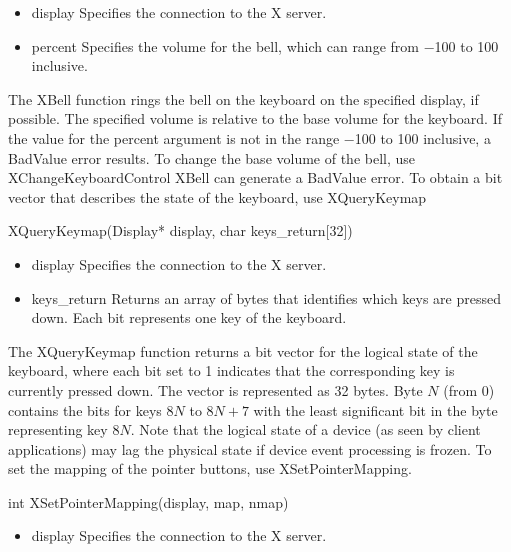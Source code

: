 \documentclass{report}
\begin{document}
\begin{itemize}
\begin{itemize}
\begin{itemize}
                \item display Speciﬁes the connection to the X server.
                \item percent Speciﬁes the volume for the bell, which can range from −100 to 100 inclusive.
            \end{itemize}
            The XBell function rings the bell on the keyboard on the specified display, if possible. The specified volume is relative to the base volume for the keyboard. If the value for the percent argument is not in the range −100 to 100 inclusive, a BadValue error results.
            \bigbreak \noindent 
            To change the base volume of the bell, use XChangeKeyboardControl
            \bigbreak \noindent 
            XBell can generate a BadValue error.
            \bigbreak \noindent 
            To obtain a bit vector that describes the state of the keyboard, use XQueryKeymap
            \bigbreak \noindent 
            \begin{cppcode}
                XQueryKeymap(Display* display, char keys_return[32])
            \end{cppcode}
            \bigbreak \noindent
            \begin{itemize}
                \item display Specifies the connection to the X server.
                \item keys\_return Returns an array of bytes that identifies which keys are pressed down. Each bit represents one key of the keyboard.
            \end{itemize}
            The XQueryKeymap function returns a bit vector for the logical state of the keyboard, where each bit set to 1 indicates that the corresponding key is currently pressed down. The vector is represented as 32 bytes. Byte $N$ (from 0) contains the bits for keys $8N$ to $8N + 7$ with the least significant bit in the byte representing key $8N$.
            \bigbreak \noindent 
            Note that the logical state of a device (as seen by client applications) may lag the physical state if device event processing is frozen.
            \bigbreak \noindent 
            To set the mapping of the pointer buttons, use XSetPointerMapping.
            \bigbreak \noindent 
            \begin{cppcode}
            int XSetPointerMapping(display, map, nmap)
            \end{cppcode}
            \bigbreak \noindent
            \begin{itemize}
                \item display Specifies the connection to the X server.

\end{itemize}
\end{itemize}
\end{itemize}
\end{document}
